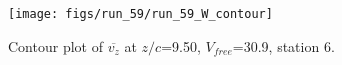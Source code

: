 \begin{figure}[H]
\centering
\texttt{[image: figs/run\_59/run\_59\_W\_contour]}
\caption{Contour plot of $\overline{v_{z}}$ at $z/c$=9.50, $V_{free}$=30.9, station 6.}
\label{fig:run_59_W_contour}
\end{figure}


